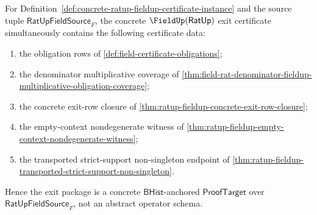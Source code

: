\begin{theorem}
\label{thm:ratup-fieldup-concrete-exit-certificate-package}
For Definition~\ref{def:concrete-ratup-fieldup-certificate-instance} and the
source tuple $\mathsf{RatUpFieldSource}_F$, the concrete
$\FieldUp(\mathsf{RatUp})$ exit certificate simultaneously contains the
following certificate data:
\begin{enumerate}
  \item the obligation rows of \autoref{def:field-certificate-obligations};
  \item the denominator multiplicative coverage of
  \autoref{thm:field-rat-denominator-fieldup-multiplicative-obligation-coverage};
  \item the concrete exit-row closure of
  \autoref{thm:ratup-fieldup-concrete-exit-row-closure};
  \item the empty-context nondegenerate witness of
  \autoref{thm:ratup-fieldup-empty-context-nondegenerate-witness};
  \item the transported strict-support non-singleton endpoint of
  \autoref{thm:ratup-fieldup-transported-strict-support-non-singleton}.
\end{enumerate}
Hence the exit package is a concrete $\mathsf{BHist}$-anchored
$\mathsf{ProofTarget}$ over $\mathsf{RatUpFieldSource}_F$, not an abstract
operator schema.
\end{theorem}
